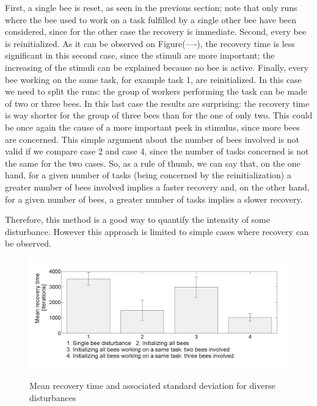 First, a single bee is reset, as seen in the previous section; note
that only runs where the bee used to work on a task fulfilled by a
single other bee have been considered, since for the other case the
recovery is immediate. Second, every bee is reinitialized. As it can
be observed on Figure(----), the recovery time is less significant
in this second case, since the stimuli are more important; the increasing
of the stimuli can be explained because no bee is active. Finally,
every bee working on the same task, for example task 1, are reinitialized.
In this case we need to split the runs: the group of workers performing
the task can be made of two or three bees. In this last case the results
are surprising: the recovery time is way shorter for the group of
three bees than for the one of only two. This could be once again
the cause of a more important peek in stimulus, since more bees are
concerned. This simple argument about the number of bees involved
is not valid if we compare case 2 and case 4, since the number of
tasks concerned is not the same for the two cases. So, as a rule of
thumb, we can say that, on the one hand, for a given number of tasks
(being concerned by the reinitialization) a greater number of bees
involved implies a faster recovery and, on the other hand, for a given
number of bees, a greater number of tasks implies a slower recovery.

Therefore, this method is a good way to quantify the intensity of
some disturbance. However this approach is limited to simple cases
where recovery can be observed.

\begin{center}
\begin{figure}[ht!]
\begin{centering}
\includegraphics[scale=0.35]{figures/Figure3}
\label{fig:figure5}
\par\end{centering}

\caption{Mean recovery time and associated standard deviation for diverse disturbances}


\end{figure}

\par\end{center}


